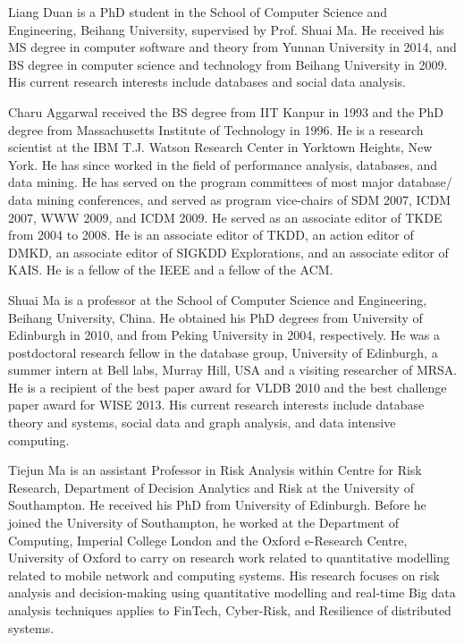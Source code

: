 \vspace{-8ex}
\begin{IEEEbiography}{Liang Duan} is a PhD student in the School of Computer Science and Engineering, Beihang University, supervised by Prof. Shuai Ma. He received his MS degree in computer software and theory from Yunnan University in 2014, and BS degree in computer science and technology from Beihang University in 2009. His current research interests include databases and social data analysis.
\end{IEEEbiography}
\vspace{-8ex}
\begin{IEEEbiography}{Charu Aggarwal} received the BS degree
from IIT Kanpur in 1993 and the PhD degree
from Massachusetts Institute of Technology in
1996. He is a research scientist at the IBM T.J.
Watson Research Center in Yorktown Heights,
New York. He has since worked in the field of
performance analysis, databases, and data mining.
He has served on the
program committees of most major database/
data mining conferences, and served as program vice-chairs of SDM 2007, ICDM 2007, WWW 2009, and ICDM
2009. He served as an associate editor of TKDE from 2004 to 2008. He is an
associate editor of TKDD, an action editor of DMKD, an associate editor of SIGKDD Explorations, and an associate editor of KAIS. He is a fellow of the IEEE and a fellow of the ACM.
\end{IEEEbiography}
\vspace{-8ex}
\begin{IEEEbiography}{Shuai Ma} is a professor at the School of Computer Science and Engineering, Beihang University, China.
He obtained his PhD degrees from University of Edinburgh in 2010, and from
Peking University in 2004, respectively.
He was a postdoctoral research fellow in the database group, University of Edinburgh, a summer intern at Bell labs, Murray Hill, USA and a visiting researcher of MRSA.
He is a recipient of the best paper award for VLDB 2010 and the best challenge paper award for WISE 2013. His current research interests include database theory and systems, social data and graph analysis, and data intensive computing.
\end{IEEEbiography}
\vspace{-8ex}
\begin{IEEEbiography}{Tiejun Ma} is an assistant Professor in Risk Analysis within Centre for Risk Research, Department of Decision Analytics and Risk at the University of Southampton. He received his PhD from University of Edinburgh. Before he joined the University of Southampton, he worked at the Department of Computing, Imperial College London and the Oxford e-Research Centre, University of Oxford to carry on research work related to quantitative modelling related to mobile network and computing systems. His research focuses on risk analysis and decision-making using quantitative modelling and real-time Big data analysis techniques applies to FinTech, Cyber-Risk, and Resilience of distributed systems.
\end{IEEEbiography}
